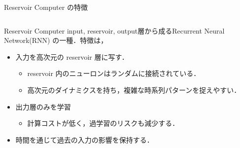 \begin{frame}{Reservoir Computer の特徴}
    \begin{columns}[T] %
  
      \begin{column}{.5\textwidth}
        \begin{block}{Reservoir Computer}
          input, reservoir, output層から成るRecurrent Neural Network(RNN) の一種．特徴は，
          \begin{itemize}
            \item 入力を高次元の reservoir 層に写す．\begin{itemize}
              \item reservoir 内のニューロンはランダムに接続されている．
              \item 高次元のダイナミクスを持ち，複雑な時系列パターンを捉えやすい．
            \end{itemize}
            \item 出力層のみを学習\begin{itemize}
              \item 計算コストが低く，過学習のリスクも減少する．
            \end{itemize}
            \item 時間を通じて過去の入力の影響を保持する．
          \end{itemize}
        \end{block}
      \end{column}

      \begin{column}{.5\textwidth}


\end{column}
\end{columns}
\end{frame}
